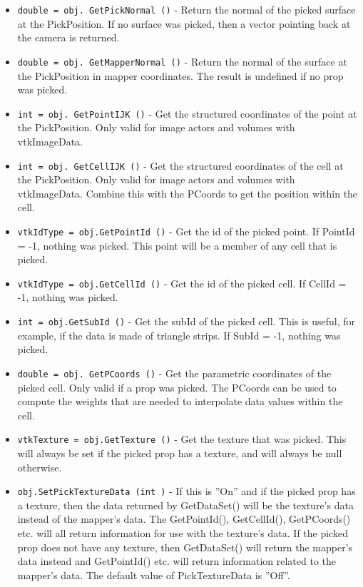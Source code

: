 \begin{itemize}
\item  \verb|double = obj. GetPickNormal ()| -  Return the normal of the picked surface at the PickPosition.  If no
 surface was picked, then a vector pointing back at the camera is
 returned.

\item  \verb|double = obj. GetMapperNormal ()| -  Return the normal of the surface at the PickPosition in mapper
 coordinates.  The result is undefined if no prop was picked.

\item  \verb|int = obj. GetPointIJK ()| -  Get the structured coordinates of the point at the PickPosition.
 Only valid for image actors and volumes with vtkImageData.

\item  \verb|int = obj. GetCellIJK ()| -  Get the structured coordinates of the cell at the PickPosition.
 Only valid for image actors and volumes with vtkImageData.
 Combine this with the PCoords to get the position within the cell.

\item  \verb|vtkIdType = obj.GetPointId ()| -  Get the id of the picked point. If PointId = -1, nothing was picked.
 This point will be a member of any cell that is picked.

\item  \verb|vtkIdType = obj.GetCellId ()| -  Get the id of the picked cell. If CellId = -1, nothing was picked.

\item  \verb|int = obj.GetSubId ()| -  Get the subId of the picked cell. This is useful, for example, if
 the data is made of triangle strips. If SubId = -1, nothing was picked.

\item  \verb|double = obj. GetPCoords ()| -  Get the parametric coordinates of the picked cell. Only valid if
 a prop was picked.  The PCoords can be used to compute the weights
 that are needed to interpolate data values within the cell.

\item  \verb|vtkTexture = obj.GetTexture ()| -  Get the texture that was picked.  This will always be set if the
 picked prop has a texture, and will always be null otherwise.

\item  \verb|obj.SetPickTextureData (int )| -  If this is ''On'' and if the picked prop has a texture, then the data
 returned by GetDataSet() will be the texture's data instead of the
 mapper's data.  The GetPointId(), GetCellId(), GetPCoords() etc. will
 all return information for use with the texture's data.  If the picked
 prop does not have any texture, then GetDataSet() will return the
 mapper's data instead and GetPointId() etc. will return information
 related to the mapper's data.  The default value of PickTextureData
 is ''Off''.


\end{itemize}
